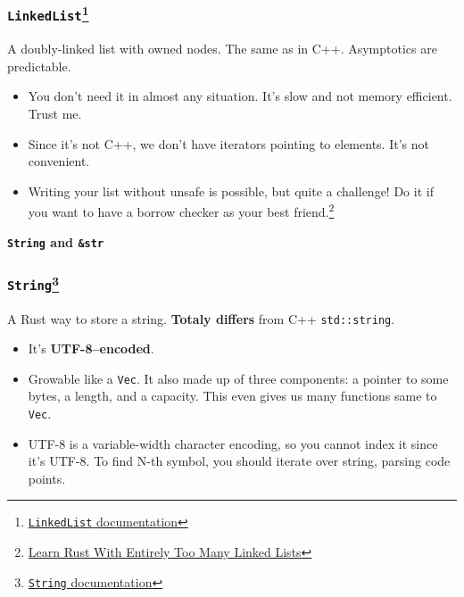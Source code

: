 \documentclass[aspectratio=1610,t]{beamer}
\begin{document}
\begin{frame}[fragile]
\frametitle{\texttt{LinkedList}\footnote{\href{https://doc.rust-lang.org/std/collections/struct.LinkedList.html}{\texttt{LinkedList} documentation}}}
A doubly-linked list with owned nodes. The same as in C++. Asymptotics are predictable.

\begin{itemize}
    \item You don't need it in almost any situation. It's slow and not memory efficient. Trust me.
    \item Since it's not C++, we don't have iterators pointing to elements. It's not convenient.
    \item Writing your list without unsafe is possible, but quite a challenge! Do it if you want to have a borrow checker as your best friend.\footnote{\href{https://rust-unofficial.github.io/too-many-lists/}{Learn Rust With Entirely Too Many Linked Lists}}
\end{itemize}
\end{frame}


\begin{frame}[c]
\centering\Huge\textbf{\texttt{String} and \texttt{\&str}}
\end{frame}


\begin{frame}[fragile]
\frametitle{\texttt{String}\footnote{\href{https://doc.rust-lang.org/std/string/struct.String.html}{\texttt{String} documentation}}}
A Rust way to store a string. \textbf{Totaly differs} from C++ \texttt{std::string}.

\begin{itemize}
    \item<2-> It's \textbf{UTF-8–encoded}.
    \item<3-> Growable like a \texttt{Vec}. It also made up of three components: a pointer to some bytes, a length, and a capacity. This even gives us many functions same to \texttt{Vec}.
    \item<4-> UTF-8 is a variable-width character encoding, so you cannot index it since it's UTF-8. To find N-th symbol, you should iterate over string, parsing code points.
\end{itemize}
\end{frame}
\end{document}
